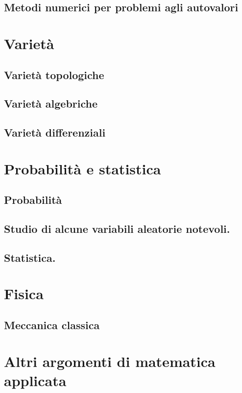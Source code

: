 \documentclass{book}
\begin{document}
	\chapter{Metodi numerici per problemi agli autovalori}
	
	\part{Variet\`a}
	\chapter{Variet\`a topologiche}
	
	\chapter{Variet\`a algebriche}
	
	\chapter{Variet\`a differenziali}
	
  \part{Probabilit\`a e statistica}
	\chapter{Probabilit\`a}
	
  \chapter{Studio di alcune variabili aleatorie notevoli.}
  
  \chapter{Statistica.}
  
	\part{Fisica}
  \chapter{Meccanica classica}
	
	\part{Altri argomenti di matematica applicata}
\end{document}
